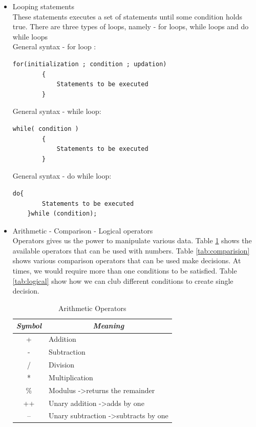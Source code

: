 \begin{itemize}
    \item Looping statements \\
    These statements executes a set of statements until some condition holds true. There are three types of loops, namely - for loops, while loops and do while loops \\
    General syntax - for loop :
    \begin{lstlisting}[style=CStyle]
        for(initialization ; condition ; updation) 
        {
            Statements to be executed
        }
    \end{lstlisting}
    General syntax - while loop:
    \begin{lstlisting}[style=CStyle]
        while( condition ) 
        {
            Statements to be executed
        }
    \end{lstlisting}
    General syntax - do while loop:
    \begin{lstlisting}[style=CStyle]
    do{
        Statements to be executed
    }while (condition);
    \end{lstlisting}

    
    \item Arithmetic - Comparison - Logical operators\\
    Operators gives us the power to manipulate various data. Table \ref{tab:arithmetic} shows the available operators that can be used with numbers. Table \ref{tab:comparision} shows various comparison operators that can be used make decisions. At times, we would require more than one conditions to be satisfied. Table \ref{tab:logical} show how we can club different conditions to create single decision.
    
    \begin{table}
        \centering
        \renewcommand{\arraystretch}{1.5}
        \begin{tabular}{|c|l|}
            \hline
            \textit{\textbf{Symbol}} & \multicolumn{1}{c|}{\textit{\textbf{Meaning}}}   \\ \hline
            +                        & Addition                                         \\ \hline
            -                        & Subtraction                                      \\ \hline
            /                        & Division                                         \\ \hline
            *                        & Multiplication                                   \\ \hline
            \%                       & Modulus -\textgreater returns the remainder      \\ \hline
            ++                       & Unary addition -\textgreater adds by one         \\ \hline
            --                       & Unary subtraction -\textgreater subtracts by one \\ \hline
        \end{tabular}
        \caption{Arithmetic Operators}
        \label{tab:arithmetic}
    \end{table}
    

\end{itemize}
